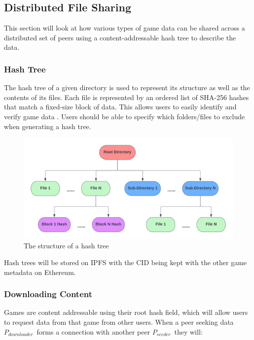 
\subsection{Distributed File Sharing}
\label{subsec:design-p2p}

This section will look at how various types of game data can be shared across a distributed set of peers using a content-addressable hash tree to describe the data.  

\subsubsection*{Hash Tree}
\label{subsubsec:hash-tree}

The hash tree of a given directory is used to represent its structure as well as the contents of its files. Each file is represented by an ordered list of SHA-256 hashes that match a fixed-size block of data. This allows users to easily identify and verify game data . Users should be able to specify which folders/files to exclude when generating a hash tree.

\begin{figure}[ht]
  \centering
  \includegraphics[width=.85\textwidth]{assets/images/diagrams/block-body.png}
  \caption{The structure of a hash tree}
  \label{fig:hash-storage}
\end{figure}

\newparagraph
Hash trees will be stored on IPFS with the CID being kept with the other game metadata on Ethereum.

\subsubsection*{Downloading Content}

\newcommand{\seeder}{$P_{seeder}$~}
\newcommand{\downloader}{$P_{downloader}$~}

Games are content addressable using their root hash field, which will allow users to request data from that game from other users. When a peer seeking data \downloader forms a connection with another peer \seeder they will:

